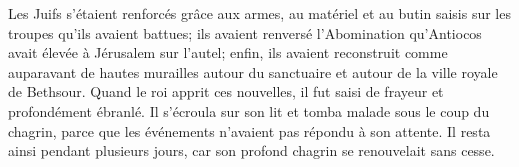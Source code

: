 Les Juifs s’étaient renforcés grâce aux armes, au matériel et au butin
	saisis sur les troupes qu’ils avaient battues;
	ils avaient renversé l’Abomination qu’Antiocos avait élevée à Jérusalem sur l’autel;
	enfin, ils avaient reconstruit comme auparavant
		de hautes murailles autour du sanctuaire
	et autour de la ville royale de Bethsour.
Quand le roi apprit ces nouvelles, il fut saisi de frayeur et profondément ébranlé.
	Il s’écroula sur son lit et tomba malade sous le coup du chagrin,
	parce que les événements n’avaient pas répondu à son attente.
Il resta ainsi pendant plusieurs jours,
	car son profond chagrin se renouvelait sans cesse. 
